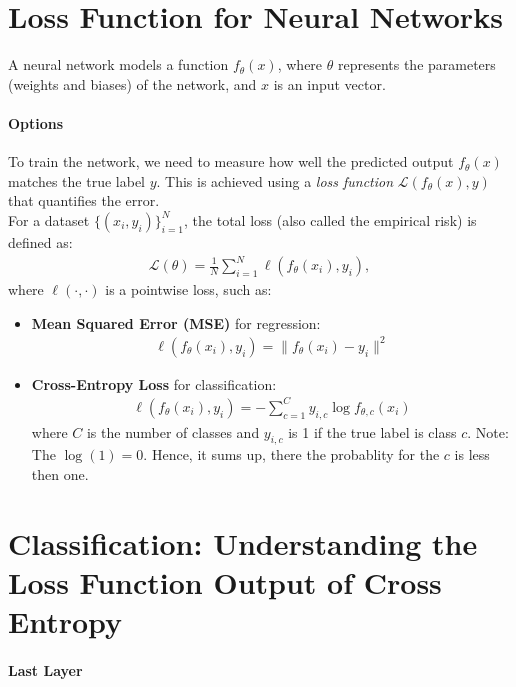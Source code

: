 \section{Loss Function for Neural Networks}
\label{sec:loss_function}

A neural network models a function $f_{\theta}(x)$, where $\theta$ represents the parameters (weights and biases) of the network, and $x$ is an input vector.

\paragraph{Options}

To train the network, we need to measure how well the predicted output $f_{\theta}(x)$ matches the true label $y$. This is achieved using a \textit{loss function} $\mathcal{L}(f_{\theta}(x), y)$ that quantifies the error.\\

For a dataset $\{(x_i, y_i)\}_{i=1}^N$, the total loss (also called the empirical risk) is defined as:
\begin{align}
	\mathcal{L}(\theta) = \frac{1}{N} \sum_{i=1}^N \ell(f_{\theta}(x_i), y_i),
\end{align}
where $\ell(\cdot, \cdot)$ is a pointwise loss, such as:\\
\begin{itemize}
	\item \textbf{Mean Squared Error (MSE)} for regression:
	\begin{align}
		\ell(f_{\theta}(x_i), y_i) = \|f_{\theta}(x_i) - y_i\|^2
	\end{align}
	\item \textbf{Cross-Entropy Loss} for classification:
	\begin{align}
		\ell(f_{\theta}(x_i), y_i) = - \sum_{c=1}^C y_{i,c} \log f_{\theta,c}(x_i)
	\end{align}
	where $C$ is the number of classes and $y_{i,c}$ is 1 if the true label is class $c$. Note: The $\log (1)= 0$. Hence, it sums up, there the probablity for the $c$ is less then one.
\end{itemize}


\section{Classification: Understanding the Loss Function Output of Cross Entropy}

\paragraph{Last Layer}

